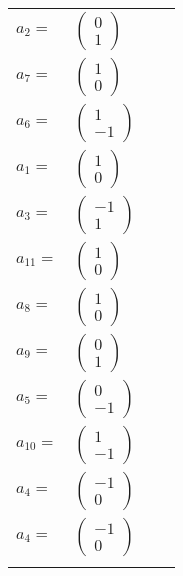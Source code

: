 \documentclass[1p]{elsarticle_modified}
\theoremstyle{definition}
\begin{document}
\begin{tabular}{m{7pt} m{180pt} m{7pt} m{180pt} }
\flushright $a_{2}=$&$\begin{pmatrix}0\\1\end{pmatrix}$ \\
\flushright $a_{7}=$&$\begin{pmatrix}1\\0\end{pmatrix}$ \\
\flushright $a_{6}=$&$\begin{pmatrix}1\\-1\end{pmatrix}$ \\
\flushright $a_{1}=$&$\begin{pmatrix}1\\0\end{pmatrix}$ \\
\flushright $a_{3}=$&$\begin{pmatrix}-1\\1\end{pmatrix}$ \\
\flushright $a_{11}=$&$\begin{pmatrix}1\\0\end{pmatrix}$ \\
\flushright $a_{8}=$&$\begin{pmatrix}1\\0\end{pmatrix}$ \\
\flushright $a_{9}=$&$\begin{pmatrix}0\\1\end{pmatrix}$ \\
\flushright $a_{5}=$&$\begin{pmatrix}0\\-1\end{pmatrix}$ \\
\flushright $a_{10}=$&$\begin{pmatrix}1\\-1\end{pmatrix}$ \\
\flushright $a_{4}=$&$\begin{pmatrix}-1\\0\end{pmatrix}$\\ \flushright $a_{4}=$&$\begin{pmatrix}-1\\0\end{pmatrix}$\\&\end{tabular}
\end{document}
